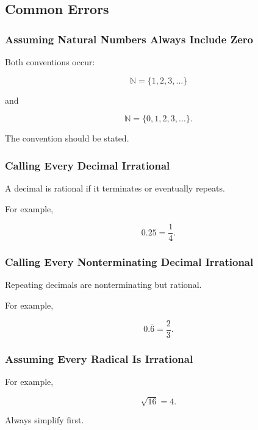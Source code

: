 \subsection{Common Errors}
\label{subsec:number-systems-common-errors}

\subsubsection{Assuming Natural Numbers Always Include Zero}

Both conventions occur:

\[
\mathbb{N}
=
\{1,2,3,\ldots\}
\]

and

\[
\mathbb{N}
=
\{0,1,2,3,\ldots\}.
\]

The convention should be stated.

\subsubsection{Calling Every Decimal Irrational}

A decimal is rational if it terminates or eventually repeats.

For example,

\[
\boxed{
0.25
=
\frac14.
}
\]

\subsubsection{Calling Every Nonterminating Decimal Irrational}

Repeating decimals are nonterminating but rational.

For example,

\[
\boxed{
0.\overline{6}
=
\frac23.
}
\]

\subsubsection{Assuming Every Radical Is Irrational}

For example,

\[
\boxed{
\sqrt{16}
=
4.
}
\]

Always simplify first.

